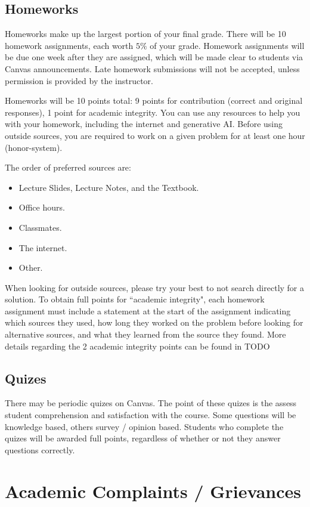 \documentclass[11pt]{article}\usepackage[]{graphicx}\usepackage[]{xcolor}
\begin{document}
\subsection{Homeworks}

Homeworks make up the largest portion of your final grade.
There will be 10 homework assignments, each worth $5\%$ of your grade.
Homework assignments will be due one week after they are assigned, which will be made clear to students via Canvas announcements.
Late homework submissions will not be accepted, unless permission is provided by the instructor.

Homeworks will be 10 points total: 9 points for contribution (correct and original responses), 1 point for academic integrity.
You can use any resources to help you with your homework, including the internet and generative AI.
Before using outside sources, you are required to work on a given problem for at least one hour (honor-system).

The order of preferred sources are:
\begin{itemize}
  \item Lecture Slides, Lecture Notes, and the Textbook.
  \item Office hours.
  \item Classmates.
  \item The internet.
  \item Other.
\end{itemize}
When looking for outside sources, please try your best to not search directly for a solution.
To obtain full points for ``academic integrity", each homework assignment must include a statement at the start of the assignment indicating which sources they used, how long they worked on the problem before looking for alternative sources, and what they learned from the source they found.
More details regarding the 2 academic integrity points can be found in TODO


\subsection{Quizes}

There may be periodic quizes on Canvas. The point of these quizes is the assess student comprehension and satisfaction with the course.
Some questions will be knowledge based, others survey / opinion based. 
Students who complete the quizes will be awarded full points, regardless of whether or not they answer questions correctly.

\section{Academic Complaints / Grievances}
\end{document}
